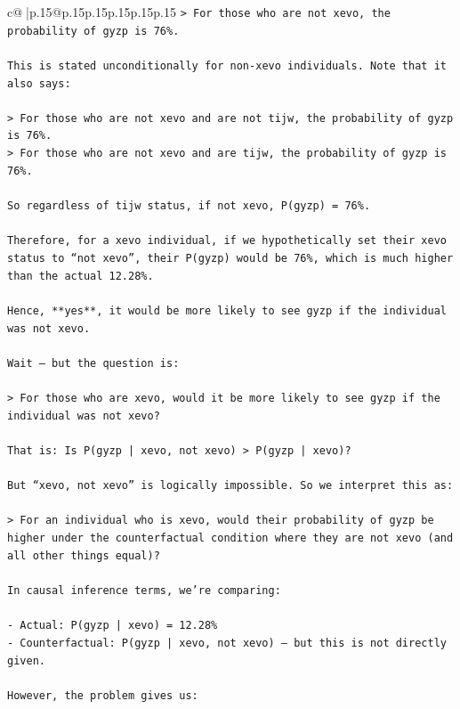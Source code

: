 \documentclass{article}
\begin{document}
{\begin{supertabular}{c@{$\;$}|p{.15\linewidth}@{}p{.15\linewidth}p{.15\linewidth}p{.15\linewidth}p{.15\linewidth}p{.15\linewidth}}
{{{\texttt{> For those who are not xevo, the probability of gyzp is 76\%.} \\
\\ 
\texttt{This is stated unconditionally for non{-}xevo individuals. Note that it also says:} \\
\\ 
\texttt{> For those who are not xevo and are not tijw, the probability of gyzp is 76\%.  } \\
\texttt{> For those who are not xevo and are tijw, the probability of gyzp is 76\%.} \\
\\ 
\texttt{So regardless of tijw status, if not xevo, P(gyzp) = 76\%.} \\
\\ 
\texttt{Therefore, for a xevo individual, if we hypothetically set their xevo status to “not xevo”, their P(gyzp) would be 76\%, which is much higher than the actual 12.28\%.} \\
\\ 
\texttt{Hence, **yes**, it would be more likely to see gyzp if the individual was not xevo.} \\
\\ 
\texttt{Wait — but the question is:} \\
\\ 
\texttt{> For those who are xevo, would it be more likely to see gyzp if the individual was not xevo?} \\
\\ 
\texttt{That is: Is P(gyzp | xevo, not xevo) > P(gyzp | xevo)?} \\
\\ 
\texttt{But “xevo, not xevo” is logically impossible. So we interpret this as:} \\
\\ 
\texttt{> For an individual who is xevo, would their probability of gyzp be higher under the counterfactual condition where they are not xevo (and all other things equal)?} \\
\\ 
\texttt{In causal inference terms, we’re comparing:} \\
\\ 
\texttt{{-} Actual: P(gyzp | xevo) = 12.28\%} \\
\texttt{{-} Counterfactual: P(gyzp | xevo, not xevo) — but this is not directly given.} \\
\\ 
\texttt{However, the problem gives us:} \\
}}}
\end{supertabular}}
\end{document}
